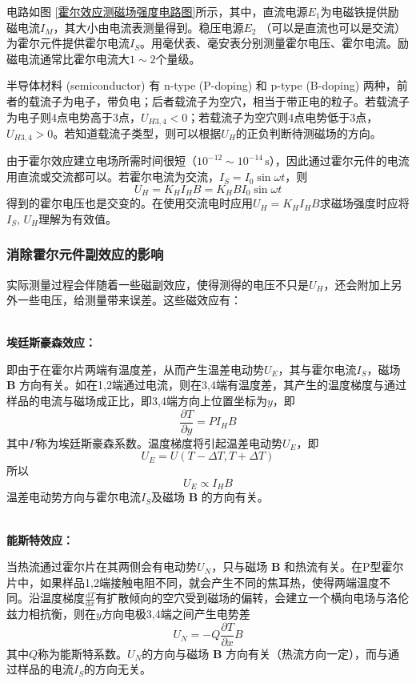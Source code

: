 \documentclass[UTF8]{article}
\theoremstyle{MyLineTheoremStyle} %
\theoremstyle{MyBlockTheoremStyle} %
\theoremstyle{MySubsubsectionStyle} %
\begin{document}
电路如图 \ref{霍尔效应测磁场强度电路图}所示，其中，直流电源$ E_1 $为电磁铁提供励磁电流$ I_M $，其大小由电流表测量得到。稳压电源$ E_2 $ （可以是直流也可以是交流）为霍尔元件提供霍尔电流$ I_S $。用毫伏表、毫安表分别测量霍尔电压、霍尔电流。励磁电流通常比霍尔电流大$ 1\sim 2 $个量级。



半导体材料 (semiconductor) 有 n-type (P-doping) 和 p-type (B-doping) 两种，前者的载流子为电子，带负电；后者载流子为空穴，相当于带正电的粒子。若载流子为电子则4点电势高于3点，$ U_{H3,4}<0 $；若载流子为空穴则4点电势低于3点，$ U_{H3,4}>0 $。若知道载流子类型，则可以根据$ U_H $的正负判断待测磁场的方向。

由于霍尔效应建立电场所需时间很短（$ 10^{-12}\sim10^{-14}\,\mathrm s $），因此通过霍尔元件的电流用直流或交流都可以。若霍尔电流为交流，$ I_S=I_0\sin\omega t $，则
\begin{equation}
U_H=K_HI_HB=K_HBI_0\sin\omega t
\end{equation}
得到的霍尔电压也是交变的。在使用交流电时应用$ U_H=K_HI_HB $求磁场强度时应将$ I_S,\,U_H $理解为有效值。

\subsubsection{消除霍尔元件副效应的影响}
实际测量过程会伴随着一些磁副效应，使得测得的电压不只是$ U_H $，还会附加上另外一些电压，给测量带来误差。这些磁效应有：	

~\\
\noindent \textbf{埃廷斯豪森效应：}\par
即由于在霍尔片两端有温度差，从而产生温差电动势$ U_E $，其与霍尔电流$ I_S $，磁场 $\boldsymbol{B}$ 方向有关。如在1,2端通过电流，则在3,4端有温度差，其产生的温度梯度与通过样品的电流与磁场成正比，即3,4端方向上位置坐标为$ y $，即
\begin{equation}
\frac{\partial T}{\partial y}=PI_HB
\end{equation}
其中$ P $称为埃廷斯豪森系数。温度梯度将引起温差电动势$ U_E $，即
\begin{equation}
U_E=U(T-\Delta T,T+\Delta T)
\end{equation}
所以
\begin{equation}
U_E\propto I_HB
\end{equation}
温差电动势方向与霍尔电流$ I_S $及磁场 $\boldsymbol{B}$ 的方向有关。

~\\
\noindent \textbf{能斯特效应：}\par
当热流通过霍尔片在其两侧会有电动势$ U_N $，只与磁场 $\boldsymbol{B}$ 和热流有关。在P型霍尔片中，如果样品1,2端接触电阻不同，就会产生不同的焦耳热，使得两端温度不同。沿温度梯度$ \frac{\mathrm{d} T}{\mathrm{d} x} $有扩散倾向的空穴受到磁场的偏转，会建立一个横向电场与洛伦兹力相抗衡，则在$ y $方向电极3,4端之间产生电势差
\begin{equation}
U_N=-Q\frac{\partial T}{\partial x}B
\end{equation}
其中$ Q $称为能斯特系数。$ U_N $的方向与磁场 $\boldsymbol{B}$ 方向有关（热流方向一定），而与通过样品的电流$ I_S $的方向无关。
\end{document}
